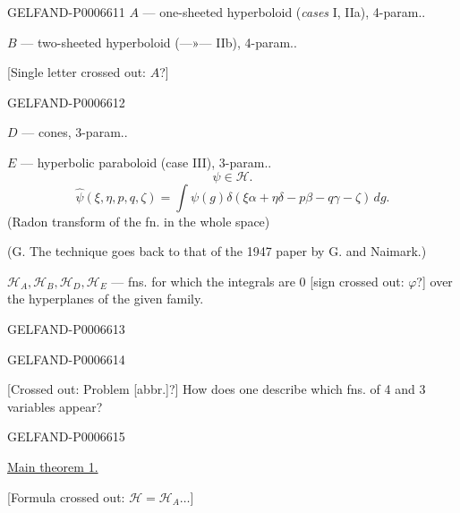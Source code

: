 \begin{GelfandAdjacentEvidence}{GELFAND-P000661}{1}
\(A\) --- one-sheeted hyperboloid (\textit{cases} I, IIa), 4-param..

\(B\) --- two-sheeted hyperboloid (---»--- IIb), 4-param..

[Single letter crossed out: \(A\)?]
\end{GelfandAdjacentEvidence}
\begin{GelfandAdjacentEvidence}{GELFAND-P000661}{2}


\(D\) --- cones, 3-param..

\(E\) --- hyperbolic paraboloid (case III), 3-param..
\[
\psi\in\mathcal H.
\]
\[
\widehat\psi(\xi,\eta,p,q,\zeta)=
\int\psi(g)\delta(\xi\alpha+\eta\delta-p\beta-q\gamma-\zeta)\,dg.
\]
(Radon transform of the fn. in the whole space)

(G. The technique goes back to that of the 1947 paper by G. and Naimark.)

\(\mathcal H_A,\mathcal H_B,\mathcal H_D,\mathcal H_E\) --- fns. for which the integrals are 0
[sign crossed out: \(\varphi\)?] over the hyperplanes of the given family.
\end{GelfandAdjacentEvidence}
\begin{GelfandAdjacentEvidence}{GELFAND-P000661}{3}

\end{GelfandAdjacentEvidence}
\begin{GelfandAdjacentEvidence}{GELFAND-P000661}{4}


[Crossed out: Problem [abbr.]?] How does one describe which fns. of 4 and 3 variables appear?
\end{GelfandAdjacentEvidence}
\begin{GelfandAdjacentEvidence}{GELFAND-P000661}{5}


\underline{Main theorem 1.}

[Formula crossed out: \(\mathcal H=\mathcal H_A\ldots\)]
\end{GelfandAdjacentEvidence}
